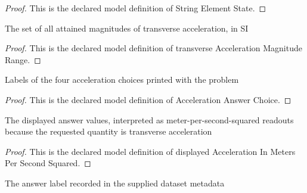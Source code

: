 \begin{proof}
  This is the declared model definition of String Element State.
\end{proof}
\begin{definition}
  \label{def:physics:phyx-mini-0240:phyxminiproblems-problemphyxmini0240-transverseaccelerationmagnituderange}
  The set of all attained magnitudes of transverse acceleration, in SI
\end{definition}
\begin{proof}
  This is the declared model definition of transverse Acceleration Magnitude Range.
\end{proof}
\begin{definition}
  \label{def:physics:phyx-mini-0240:phyxminiproblems-problemphyxmini0240-accelerationanswerchoice}
  Labels of the four acceleration choices printed with the problem
\end{definition}
\begin{proof}
  This is the declared model definition of Acceleration Answer Choice.
\end{proof}
\begin{definition}
  \label{def:physics:phyx-mini-0240:phyxminiproblems-problemphyxmini0240-displayedaccelerationinmeterspersecondsquared}
  The displayed answer values, interpreted as meter-per-second-squared readouts because the requested quantity is transverse acceleration
\end{definition}
\begin{proof}
  This is the declared model definition of displayed Acceleration In Meters Per Second Squared.
\end{proof}
\begin{definition}
  \label{def:physics:phyx-mini-0240:phyxminiproblems-problemphyxmini0240-recordeddatasetanswer}
  The answer label recorded in the supplied dataset metadata
\end{definition}
